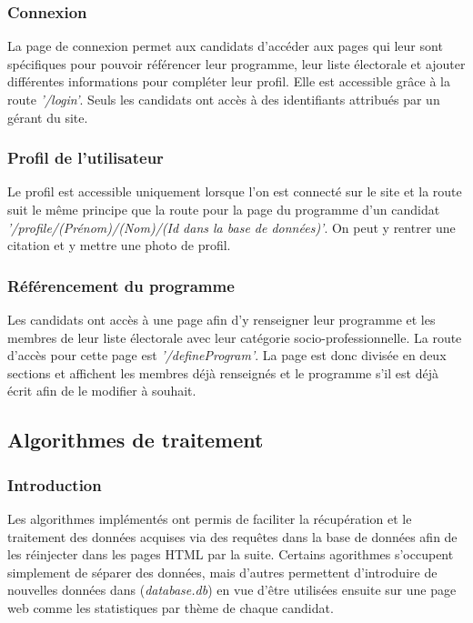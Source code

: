 \subsubsection{Connexion}
\vskip 0.25cm
\noindent
La page de connexion permet aux candidats d'accéder aux pages qui leur sont spécifiques pour pouvoir référencer leur programme, leur liste électorale et ajouter différentes informations pour compléter leur profil. Elle est accessible grâce à la route \textit{'/login'}. Seuls les candidats ont accès à des identifiants attribués par un gérant du site.
\vskip 0.25cm
\subsubsection{Profil de l'utilisateur}
\vskip 0.25cm
\noindent
Le profil est accessible uniquement lorsque l'on est connecté sur le site et la route suit le même principe que la route pour la page du programme d'un candidat \textit{'/profile/(Prénom)/(Nom)/(Id dans la base de données)'}. On peut y rentrer une citation et y mettre une photo de profil.
\vskip 0.25cm
\subsubsection{Référencement du programme}
\vskip 0.25cm
\noindent
Les candidats ont accès à une page afin d'y renseigner leur programme et les membres de leur liste électorale avec leur catégorie socio-professionnelle. La route d'accès pour cette page est \textit{'/defineProgram'}. La page est donc divisée en deux sections et affichent les membres déjà renseignés et le programme s'il est déjà écrit afin de le modifier à souhait.
\vskip 0.25cm
\subsection{Algorithmes de traitement}
\vskip 0.25cm
\subsubsection{Introduction}
\vskip 0.25cm
\noindent
Les algorithmes implémentés ont permis de faciliter la récupération et le traitement des données acquises via des requêtes dans la base de données afin de les réinjecter dans les pages HTML par la suite. Certains agorithmes s'occupent simplement de séparer des données, mais d'autres permettent d'introduire de nouvelles données dans (\textit{database.db}) en vue d'être utilisées ensuite sur une page web comme les statistiques par thème de chaque candidat.
\vskip 0.25cm
